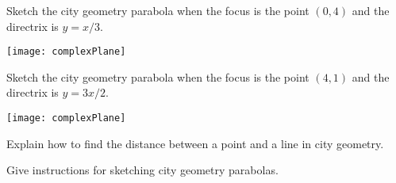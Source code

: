 \documentclass{ximera}
\begin{document}
\break

\begin{problem}
Sketch the city geometry parabola when the focus is the point $(0,4)$
and the directrix is $y=x/3$.
\begin{image}
\texttt{[image: complexPlane]}
\end{image}
\end{problem}

\break

\begin{problem}
Sketch the city geometry parabola when the focus is the point $(4,1)$
and the directrix is $y=3x/2$.
\begin{image}
\texttt{[image: complexPlane]}
\end{image}
\end{problem}

\begin{problem}
Explain how to find the distance between a point and a line in city
geometry.
\end{problem}


\begin{problem}
Give instructions for sketching city geometry parabolas.
\end{problem}
\end{document}
